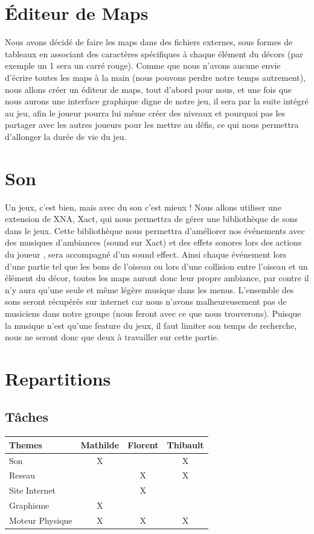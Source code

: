 \documentclass [11pt]{report}
\begin{document}
	\section {\'Editeur de Maps}
		Nous avons décidé de faire les maps dans des fichiers externes, sous formes de tableaux en associant des caractères spécifiques à chaque élément du décors (par exemple un 1 sera un carré rouge). Comme que nous n'avons aucune envie d'écrire toutes les maps à la main (nous pouvons perdre notre temps autrement), nous 		allons créer un éditeur de maps, tout d'abord pour nous, et une fois que nous aurons une interface graphique digne de notre jeu, il sera par la suite intégré au jeu, afin le joueur pourra lui même créer des niveaux et pourquoi pas les partager avec les autres joueurs pour les mettre au défis, ce qui nous permettra d'allonger la durée de 		vie du jeu.\\\vspace{5mm}


\newpage
	\section {Son}
		Un jeux, c'est bien, mais avec du son c'est mieux ! Nous allons utiliser une extension de XNA, Xact, qui nous permettra de g\'erer une biblioth\`eque de sons dans le jeux. Cette biblioth\`eque nous permettra d'am\'eliorer nos \'ev\'enements avec des musiques d'ambiances (sound sur Xact) et des effets sonores lors des actions du 		joueur , sera accompagné d'un sound effect. Ainsi chaque événement lors d'une partie tel que les bons de l'oiseau ou lors d'une collision entre l'oiseau et un élément du décor, toutes les maps auront donc leur propre ambiance, par contre il n'y aura qu'une seule et même légère musique dans les menus. L'ensemble des sons seront récupérés sur internet car nous n'avons malheureusement pas de musiciens dans notre groupe (nous feront avec ce que nous trouverons). Puisque la musique n'est qu'une feature du jeux, il faut limiter son temps de recherche, nous ne seront donc que deux à travailler sur cette partie.\\\vspace{5mm}

	\section{Repartitions}
		\subsection{Tâches}
			\begin{tabular}{| l |*{3} {c|}}
				\hline
				Themes & Mathilde & Florent & Thibault \\
				\hline
				Son & X & & X \\
				\hline
				Reseau & & X & X \\
				\hline
				Site Internet & & X & \\
				\hline
				Graphisme & X & & \\
				\hline
				Moteur Physique & X & X & X\\
				\hline
			\end{tabular}\\\vspace{3mm}
\end{document}
